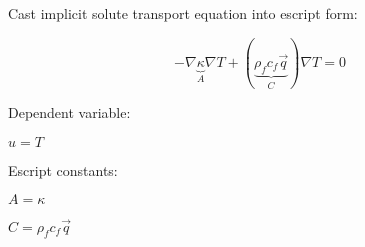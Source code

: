 \documentclass[11pt]{article}
\begin{document}
Cast implicit solute transport equation into escript form:

\begin{equation}
    - \nabla \underbrace{ \kappa}_A \nabla T + ( \underbrace{ \rho_f c_f \vec{q}}_C ) \nabla T  =  0
\end{equation}

Dependent variable:

$ u = T $

Escript constants:

$ A = \kappa $

$ C = \rho_f c_f \vec{q} $


\pagebreak



\end{document}
